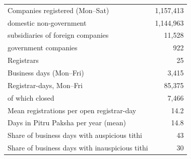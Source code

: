 \begin{tabular}{lr}
\toprule
Companies registered (Mon--Sat) & 1,157,413 \\
\quad domestic non-government & 1,144,963 \\
\quad subsidiaries of foreign companies & 11,528 \\
\quad government companies & 922 \\
Registrars & 25 \\
Business days (Mon--Fri) & 3,415 \\
Registrar-days, Mon--Fri & 85,375 \\
\quad of which closed & 7,466 \\
Mean registrations per open registrar-day & 14.2 \\
Days in Pitru Paksha per year (mean) & 14.8 \\
Share of business days with auspicious tithi & 43 \\
Share of business days with inauspicious tithi & 30 \\
\bottomrule
\end{tabular}
